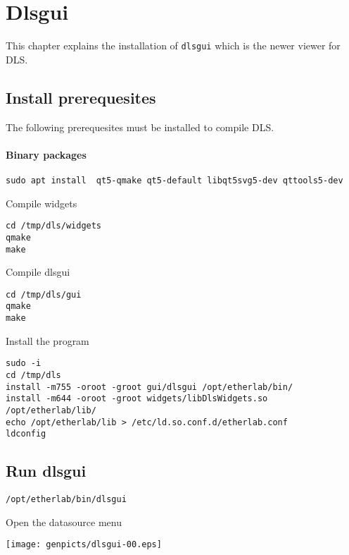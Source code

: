 \chapter{Dlsgui}

\label{chap:dlsgui}
This chapter explains the installation of \texttt{dlsgui} which is the
newer viewer for DLS.

\section{Install prerequesites}

The following prerequesites must be installed to compile DLS.

\subsubsection{Binary packages}
\begin{verbatim}
sudo apt install  qt5-qmake qt5-default libqt5svg5-dev qttools5-dev

\end{verbatim}

\noindent Compile widgets

\begin{verbatim}
cd /tmp/dls/widgets
qmake
make
\end{verbatim}


\noindent Compile dlsgui
\begin{verbatim}
cd /tmp/dls/gui
qmake
make
\end{verbatim}

\noindent Install the program

\begin{verbatim}
sudo -i
cd /tmp/dls
install -m755 -oroot -groot gui/dlsgui /opt/etherlab/bin/
install -m644 -oroot -groot widgets/libDlsWidgets.so  /opt/etherlab/lib/
echo /opt/etherlab/lib > /etc/ld.so.conf.d/etherlab.conf
ldconfig
\end{verbatim}



\section{Run dlsgui}


\begin{verbatim}
/opt/etherlab/bin/dlsgui
\end{verbatim}

\noindent Open the datasource menu
\begin{center}
\texttt{[image: genpicts/dlsgui-00.eps]}
\end{center}

